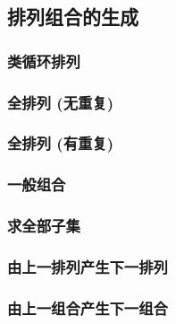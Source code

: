 \subsection{排列组合的生成}
    \subsubsection{类循环排列}
    \subsubsection{全排列 (无重复)}
    \subsubsection{全排列 (有重复)}
    \subsubsection{一般组合}
    \subsubsection{求全部子集}
    \subsubsection{由上一排列产生下一排列}
    \subsubsection{由上一组合产生下一组合}
